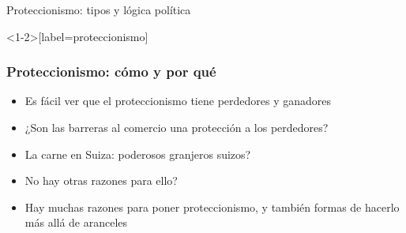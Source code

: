 \begin{transitionframe}
Proteccionismo: tipos y lógica política
\end{transitionframe}
\note{}



\begin{frame}<1-2>[label=proteccionismo]
\frametitle{Proteccionismo: cómo y por qué}
\centering

\begin{itemize}
    \item Es fácil ver que el proteccionismo tiene perdedores y ganadores
    \item ¿Son las barreras al comercio una protección a los perdedores?
    \item<2-> La carne en Suiza: poderosos granjeros suizos?
    \item<2-> No hay otras razones para ello?
    \vspace{10pt}
    \item<3-> Hay muchas razones para poner proteccionismo, y también formas de hacerlo más allá de aranceles
\end{itemize}

\end{frame}
\note{}
  
\note{}

\note{}

\note{}

\note{}




